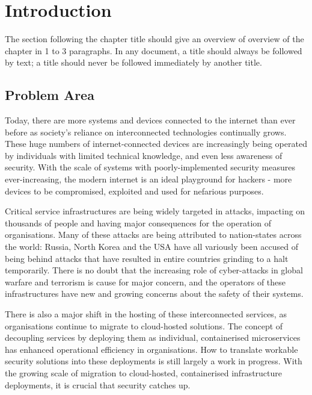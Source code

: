 \chapter{Introduction}

The section following the chapter title should give an overview of overview of the chapter in 1 to 3 paragraphs. In any document, a title should always be followed by text; a title should never be followed immediately by another title.


\section{Problem Area}



Today, there are more systems and devices connected to the internet than ever before as society's reliance on interconnected technologies continually grows. These huge numbers of internet-connected devices are increasingly being operated by individuals with limited technical knowledge, and even less awareness of security. With the scale of systems with poorly-implemented security measures ever-increasing, the modern internet is an ideal playground for hackers - more devices to be compromised, exploited and used for nefarious purposes.

Critical service infrastructures are being widely targeted in attacks, impacting on thousands of people and having major consequences for the operation of organisations. Many of these attacks are being attributed to nation-states across the world: Russia, North Korea and the USA have all variously been accused of being behind attacks that have resulted in entire countries grinding to a halt temporarily. There is no doubt that the increasing role of cyber-attacks in global warfare and terrorism is cause for major concern, and the operators of these infrastructures have new and growing concerns about the safety of their systems. 

There is also a major shift in the hosting of these interconnected services, as organisations continue to migrate to cloud-hosted solutions. The concept of decoupling services by deploying them as individual, containerised microservices has enhanced operational efficiency in organisations. How to translate workable security solutions into these deployments is still largely a work in progress. With the growing scale of migration to cloud-hosted, containerised infrastructure deployments, it is crucial that security catches up.

